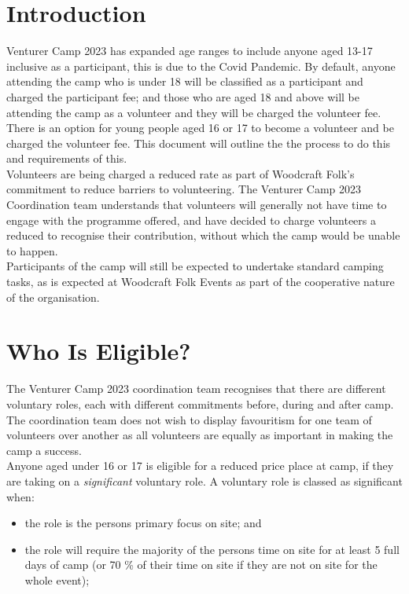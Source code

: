 \documentclass[a4paper, 11pt]{article}
\begin{document}
    \section{Introduction}
    Venturer Camp 2023 has expanded age ranges to include anyone aged 13-17 inclusive as a participant, this is due to the Covid Pandemic. By default, anyone attending the camp who is under 18 will be classified as a participant and charged the participant fee; and those who are aged 18 and above will be attending the camp as a volunteer and they will be charged the volunteer fee. There is an option for young people aged 16 or 17 to become a volunteer and be charged the volunteer fee. This document will outline the the process to do this and requirements of this. \\

    Volunteers are being charged a reduced rate as part of Woodcraft Folk's commitment to reduce barriers to volunteering. The Venturer Camp 2023 Coordination team understands that volunteers will generally not have time to engage with the programme offered, and have decided to charge volunteers a reduced to recognise their contribution, without which the camp would be unable to happen.\\

    Participants of the camp will still be expected to undertake standard camping tasks, as is expected at Woodcraft Folk Events as part of the cooperative nature of the organisation. 

    \section{Who Is Eligible?}
    The Venturer Camp 2023 coordination team recognises that there are different voluntary roles, each with different commitments before, during and after camp. The coordination team does not wish to display favouritism for one team of volunteers over another as all volunteers are equally as important in making the camp a success.\\

    Anyone aged under 16 or 17 is eligible for a reduced price place at camp, if they are taking on a \textit{significant} voluntary role. A voluntary role is classed as significant when:
    \begin{itemize}
        \item the role is the persons primary focus on site; and
        \item the role will require the majority of the persons time on site for at least 5 full days of camp (or 70 \% of their time on site if they are not on site for the whole event);
    \end{itemize}
    
\end{document}
